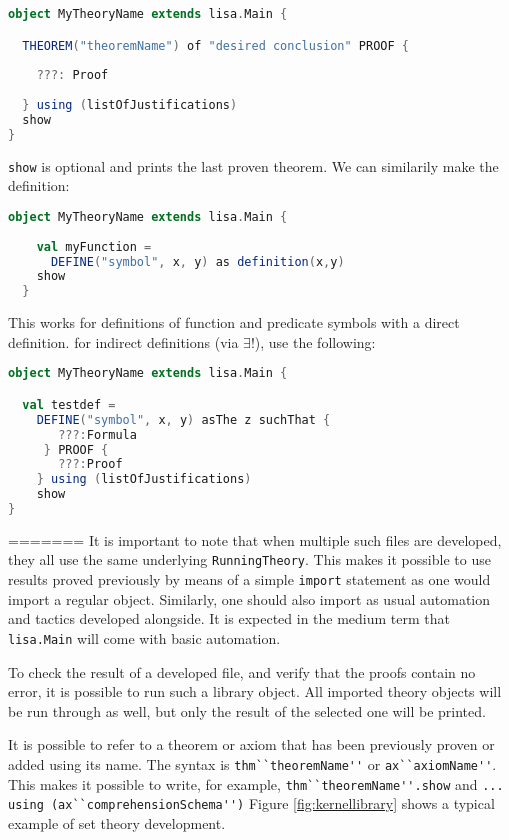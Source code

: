 \begin{lstlisting}[language=Scala, frame=single]
object MyTheoryName extends lisa.Main {

  THEOREM("theoremName") of "desired conclusion" PROOF {
    
    ???: Proof
    
  } using (listOfJustifications)
  show
}
\end{lstlisting}
\lstinline{show}{} is optional and prints the last proven theorem. We can similarily make the definition:

\noindent
\begin{minipage}{\textwidth}
  \begin{lstlisting}[language=Scala, frame=single]
  object MyTheoryName extends lisa.Main {
  
    val myFunction = 
      DEFINE("symbol", x, y) as definition(x,y)
    show
  }
  \end{lstlisting}
\end{minipage}
%
This works for definitions of function and predicate symbols with a direct definition. for indirect definitions (via $\exists !$), use the following:
%
\begin{lstlisting}[language=Scala, frame=single]
object MyTheoryName extends lisa.Main {

  val testdef =
    DEFINE("symbol", x, y) asThe z suchThat {
       ???:Formula
     } PROOF {
       ???:Proof
    } using (listOfJustifications)
    show
}
\end{lstlisting}


=======
It is important to note that when multiple such files are developed, they all use the same underlying \lstinline{RunningTheory}{}. This makes it possible to use results proved previously by means of a simple \lstinline{import}{} statement as one would import a regular object. Similarly, one should also import as usual automation and tactics developed alongside. It is expected in the medium term that \lstinline{lisa.Main}{} will come with basic automation.

To check the result of a developed file, and verify that the proofs contain no error, it is possible to run such a library object.
All imported theory objects will be run through as well, but only the result of the selected one will be printed.

It is possible to refer to a theorem or axiom that has been previously proven or added using its name. The syntax is \lstinline{thm``theoremName''}{} or \lstinline{ax``axiomName''}{}. This makes it possible to write, for example, \lstinline{thm``theoremName''.show}{} and \lstinline{... using (ax``comprehensionSchema'')} Figure \ref{fig:kernellibrary} shows a typical example of set theory development.



